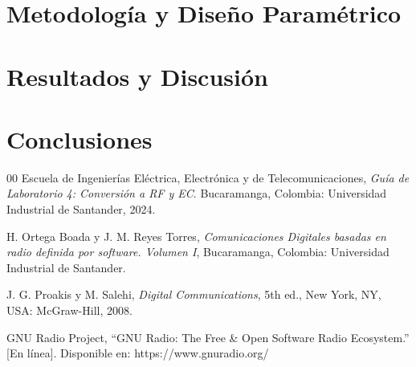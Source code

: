 \documentclass[conference, 10pt]{IEEEtran}
\begin{document}
\section{Metodología y Diseño Paramétrico}



\section{Resultados y Discusión}




\section{Conclusiones}


\begin{thebibliography}{00}
Escuela de Ingenierías Eléctrica, Electrónica y de Telecomunicaciones, \textit{Guía de Laboratorio 4: Conversión a RF y EC}. Bucaramanga, Colombia: Universidad Industrial de Santander, 2024.

H. Ortega Boada y J. M. Reyes Torres, \textit{Comunicaciones Digitales basadas en radio definida por software. Volumen I}, Bucaramanga, Colombia: Universidad Industrial de Santander.

J. G. Proakis y M. Salehi, \textit{Digital Communications}, 5th ed., New York, NY, USA: McGraw-Hill, 2008.

GNU Radio Project, ``GNU Radio: The Free \& Open Software Radio Ecosystem.'' [En línea]. Disponible en: https://www.gnuradio.org/

\end{thebibliography}
\end{document}
